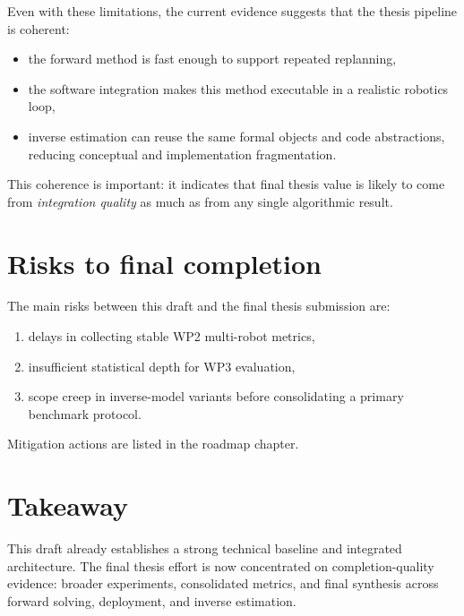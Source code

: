 Even with these limitations, the current evidence suggests that the thesis
pipeline is coherent:

\begin{itemize}
    \item the forward method is fast enough to support repeated replanning,
    \item the software integration makes this method executable in a realistic
    robotics loop,
    \item inverse estimation can reuse the same formal objects and code
    abstractions, reducing conceptual and implementation fragmentation.
\end{itemize}

This coherence is important: it indicates that final thesis value is likely to
come from \emph{integration quality} as much as from any single algorithmic
result.

\section{Risks to final completion}

The main risks between this draft and the final thesis submission are:

\begin{enumerate}
    \item delays in collecting stable WP2 multi-robot metrics,
    \item insufficient statistical depth for WP3 evaluation,
    \item scope creep in inverse-model variants before consolidating a primary
    benchmark protocol.
\end{enumerate}

Mitigation actions are listed in the roadmap chapter.

\section{Takeaway}

This draft already establishes a strong technical baseline and integrated
architecture. The final thesis effort is now concentrated on completion-quality
evidence: broader experiments, consolidated metrics, and final synthesis across
forward solving, deployment, and inverse estimation.
